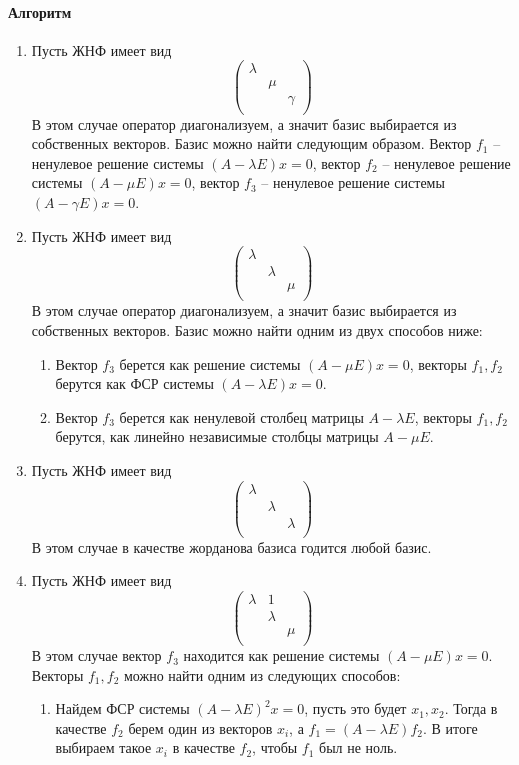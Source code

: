 \documentclass{article}
\begin{document}
\paragraph{Алгоритм}
\begin{enumerate}
\item Пусть ЖНФ имеет вид
\[
\begin{pmatrix}
{\lambda}&{}&{}\\
{}&{\mu}&{}\\
{}&{}&{\gamma}\\
\end{pmatrix}
\]
В этом случае оператор диагонализуем, а значит базис выбирается из собственных векторов. Базис можно найти следующим образом. Вектор $f_1$ -- ненулевое решение системы $(A - \lambda E) x = 0$, вектор $f_2 $ -- ненулевое решение системы $(A - \mu E) x = 0$, вектор $f_3$ -- ненулевое решение системы $(A - \gamma E) x = 0$.

\item Пусть ЖНФ имеет вид
\[
\begin{pmatrix}
{\lambda}&{}&{}\\
{}&{\lambda}&{}\\
{}&{}&{\mu}\\
\end{pmatrix}
\]
В этом случае оператор диагонализуем, а значит базис выбирается из собственных векторов. Базис можно найти одним из двух способов ниже:
\begin{enumerate}
\item Вектор $f_3$ берется как решение системы $(A - \mu E) x = 0$, векторы $f_1, f_2$ берутся как ФСР системы $(A - \lambda E) x = 0$.

\item Вектор $f_3$ берется как ненулевой столбец матрицы $A - \lambda E$, векторы $f_1, f_2$ берутся, как линейно независимые столбцы матрицы $A - \mu  E$.
\end{enumerate}

\item Пусть ЖНФ имеет вид
\[
\begin{pmatrix}
{\lambda}&{}&{}\\
{}&{\lambda}&{}\\
{}&{}&{\lambda}\\
\end{pmatrix}
\]
В этом случае в качестве жорданова базиса годится любой базис.

\item Пусть ЖНФ имеет вид
\[
\begin{pmatrix}
{\lambda}&{1}&{}\\
{}&{\lambda}&{}\\
{}&{}&{\mu}\\
\end{pmatrix}
\]
В этом случае вектор $f_3$ находится как решение системы $(A - \mu E) x = 0$. Векторы $f_1, f_2$ можно найти одним из следующих способов:
\begin{enumerate}
\item Найдем ФСР системы $(A - \lambda E)^2 x = 0$, пусть это будет $x_1, x_2$. Тогда в качестве $f_2$ берем один из векторов $x_i$, а $f_1 = (A - \lambda E) f_2$. В итоге выбираем такое $x_i$ в качестве $f_2$, чтобы $f_1$ был не ноль.


\end{enumerate}
\end{enumerate}
\end{document}
